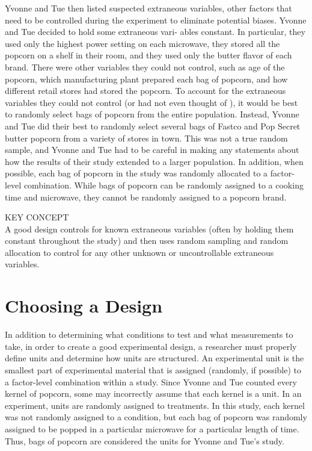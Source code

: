 \documentclass[
]{report}
\begin{document}
Yvonne and Tue then listed suspected extraneous variables, other factors that need to be controlled
during the experiment to eliminate potential biases. Yvonne and Tue decided to hold some extraneous vari-
ables constant. In particular, they used only the highest power setting on each microwave, they stored all
the popcorn on a shelf in their room, and they used only the butter flavor of each brand. There were other
variables they could not control, such as age of the popcorn, which manufacturing plant prepared each bag
of popcorn, and how different retail stores had stored the popcorn. To account for the extraneous variables
they could not control (or had not even thought of ), it would be best to randomly select bags of popcorn from
the entire population. Instead, Yvonne and Tue did their best to randomly select several bags of Fastco and
Pop Secret butter popcorn from a variety of stores in town. This was not a true random sample, and Yvonne
and Tue had to be careful in making any statements about how the results of their study extended to a larger
population. In addition, when possible, each bag of popcorn in the study was randomly allocated to a factor-
level combination. While bags of popcorn can be randomly assigned to a cooking time and microwave, they
cannot be randomly assigned to a popcorn brand.

KEY CONCEPT\\
A good design controls for known extraneous variables (often by holding them constant throughout
the study) and then uses random sampling and random allocation to control for any other unknown or
uncontrollable extraneous variables.

\section{Choosing a Design}\label{choosing-a-design}

In addition to determining what conditions to test and what measurements to take, in order to create a good
experimental design, a researcher must properly define units and determine how units are structured. An
experimental unit is the smallest part of experimental material that is assigned (randomly, if possible) to a
factor-level combination within a study. Since Yvonne and Tue counted every kernel of popcorn, some may
incorrectly assume that each kernel is a unit. In an experiment, units are randomly assigned to treatments.
In this study, each kernel was not randomly assigned to a condition, but each bag of popcorn was randomly
assigned to be popped in a particular microwave for a particular length of time. Thus, bags of popcorn are
considered the units for Yvonne and Tue's study.
\end{document}
